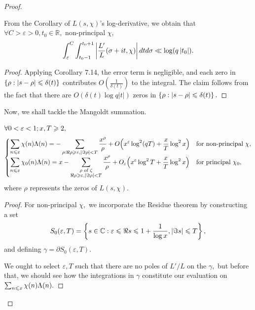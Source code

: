 \begin{proof}
\begin{lemma}
    From the Corollary of $L(s, \chi)$'s log-derivative, we obtain that $\forall C > \varepsilon > 0, t_0 \in \mathbb{R},$ non-principal $\chi,$ $$\int_\varepsilon^C \int_{t_0-1}^{t_0+1} \left\lvert \frac{L'}{L}(\sigma + it, \chi) \right\rvert dt d\sigma \ll \log(q\left\lvert t_0 \right\rvert).$$
\end{lemma}
\begin{proof}
Applying Corollary 7.14, the error term is negligible, and each zero in $\left\{ \rho: \left\lvert s - \rho \right\rvert \leqslant \delta(t) \right\}$ contributes $O(\frac{1}{\delta(t)})$ to the integral. The claim follows from the fact that there are $O(\delta(t) \log q|t|)$ zeros in $\left\{ \rho: \left\lvert s - \rho \right\rvert \leqslant \delta(t) \right\}.$
\end{proof}


Now, we shall tackle the Mangoldt summation.
\begin{theorem}
    $\forall 0 < \varepsilon < 1; x,T \geqslant 2,$ 
    $$
    \begin{cases}
        \displaystyle \sum_{n \leqslant x} \chi(n) \Lambda(n) = -\sum_{\rho: \Re \rho \geqslant \varepsilon, \left\lvert \Im \rho \right\rvert < T} \frac{x^\rho}{\rho} + O\!\left( x^\varepsilon \log^2(qT) + \frac{x}{T} \log^2 x \right) &\text{for non-principal } \chi, \\
        \displaystyle \sum_{n \leqslant x} \chi_0(n) \Lambda(n) = x -\sum_{\substack{\rho \text{ of } \zeta \\ \Re \rho \geqslant \varepsilon, \left\lvert \Im \rho \right\rvert < T}} \frac{x^\rho}{\rho} + O_\varepsilon \!\left( x^\varepsilon \log^2 T + \frac{x}{T} \log^2 x \right) &\text{for principal } \chi_0,
    \end{cases}
    $$ 
    where $\rho$ represents the zeros of $L(s, \chi).$
\end{theorem}
\begin{proof}
For non-principal $\chi,$ we incorporate the Residue theorem by constructing a set $$S_0(\varepsilon, T) = \left\{ s \in \mathbb{C}: \varepsilon \leqslant \Re s \leqslant 1 + \frac{1}{\log x}, \left\lvert \Im s \right\rvert \leqslant T \right\},$$ and defining $\gamma = \partial S_0(\varepsilon, T).$ 

We ought to select $\varepsilon, T$ such that there are no poles of $L'/L$ on the $\gamma,$ but before that, we should see how the integrations in $\gamma$ constitute our evaluation on $\sum_{n \leqslant x} \chi(n)\Lambda(n).$


\end{proof}
\end{proof}
